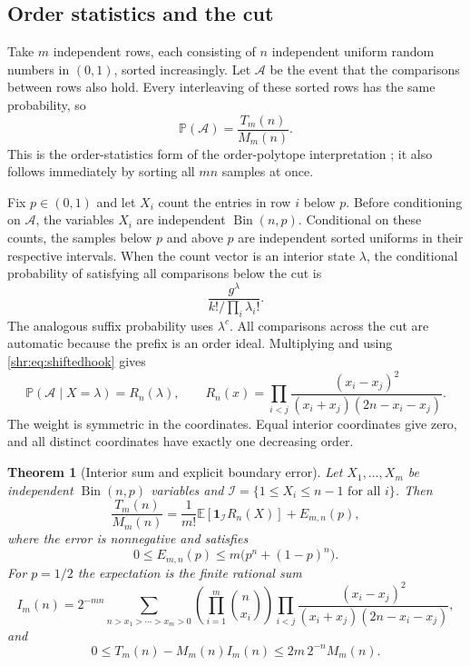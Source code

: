 \documentclass[11pt,letterpaper]{article}
\numberwithin{equation}{section}
\newtheorem{theorem}{Theorem}[section]
\theoremstyle{definition}
\newcommand{\E}{\mathbb E}
\newcommand{\Pp}{\mathbb P}
\newcommand{\1}{\mathbf 1}
\begin{document}
\subsection{Order statistics and the cut}
Take $m$ independent rows, each consisting of $n$ independent uniform
random numbers in $(0,1)$, sorted increasingly. Let $\mathcal A$ be the event
that the comparisons between rows also hold. Every interleaving of these
sorted rows has the same probability, so
\begin{equation}
 \Pp(\mathcal A)=\frac{T_m(n)}{M_m(n)}.
 \label{shr:eq:probability}
\end{equation}
This is the order-statistics form of the order-polytope interpretation
\cite{Sun}; it also follows immediately by sorting all $mn$ samples at once.

Fix $p\in(0,1)$ and let $X_i$ count the entries in row $i$ below $p$.
Before conditioning on $\mathcal A$, the variables $X_i$ are independent
$\operatorname{Bin}(n,p)$. Conditional on these counts, the samples below
$p$ and above $p$ are independent sorted uniforms in their respective
intervals. When the count vector is an interior state $\lambda$, the
conditional probability of satisfying all comparisons below the cut is
\[
 \frac{g^\lambda}{k!/\prod_i\lambda_i!}.
\]
The analogous suffix probability uses $\lambda^c$. All comparisons across
the cut are automatic because the prefix is an order ideal. Multiplying
and using \eqref{shr:eq:shiftedhook} gives
\begin{equation}
 \Pp(\mathcal A\mid X=\lambda)=R_n(\lambda),\qquad
 R_n(x)=\prod_{i<j}
 \frac{(x_i-x_j)^2}{(x_i+x_j)(2n-x_i-x_j)}.
 \label{shr:eq:Rweight}
\end{equation}
The weight is symmetric in the coordinates. Equal interior coordinates
give zero, and all distinct coordinates have exactly one decreasing order.

\begin{theorem}[Interior sum and explicit boundary error]\label{shr:thm:cut}
Let $X_1,\ldots,X_m$ be independent $\operatorname{Bin}(n,p)$ variables and
$\mathcal I=\{1\le X_i\le n-1\text{ for all }i\}$. Then
\begin{equation}
 \frac{T_m(n)}{M_m(n)}=
 \frac1{m!}\E\left[\1_{\mathcal I}R_n(X)\right]+E_{m,n}(p),
 \label{shr:eq:exactcut}
\end{equation}
where the error is nonnegative and satisfies
\begin{equation}
 0\le E_{m,n}(p)\le m\bigl(p^n+(1-p)^n\bigr).
 \label{shr:eq:boundary}
\end{equation}
For $p=1/2$ the expectation is the finite rational sum
\begin{equation}
 I_m(n)=2^{-mn}
 \sum_{n>x_1>\cdots>x_m>0}
 \left(\prod_{i=1}^m\binom n{x_i}\right)
 \prod_{i<j}\frac{(x_i-x_j)^2}{(x_i+x_j)(2n-x_i-x_j)},
 \label{shr:eq:interiorsum}
\end{equation}
and
\begin{equation}
 0\le T_m(n)-M_m(n)I_m(n)\le 2m\,2^{-n}M_m(n).
 \label{shr:eq:exactbound}
\end{equation}
\end{theorem}
\end{document}
